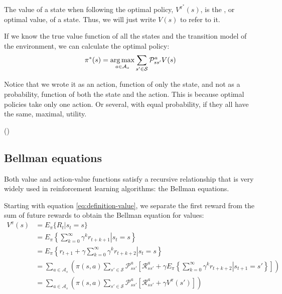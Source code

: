 The value of a state when following the optimal policy, $V^{\pi^*}(s)$, is the
, or optimal value, of a state. Thus, we will just write $V(s)$ to refer to it.

If we know the true value function of all the states and the transition model of
the environment, we can calculate the optimal policy:
\begin{equation}
  \pi^*(s) = \argmax_{a\in\mathcal{A}_s} \sum_{s'\in\mathcal{S}}\mathcal{P}^a_{ss'}V(s)
  \label{eq:optimal-policy-value}
\end{equation}

Notice that we wrote it as an action, function of only the state, and not as a
probability, function of both the state and the action. This is because optimal
policies take only one action. Or several, with equal probability, if they all
have the same, maximal, utility.

(\cite[Subsection~17.1.2]{russell2009aima})

\subsection{Bellman equations}
Both value and action-value functions satisfy a recursive relationship that is
very widely used in reinforcement learning algorithms: the Bellman equations.

Starting with equation \ref{eq:definition-value}, we separate the first reward
from the sum of future rewards to obtain the Bellman equation for values:
\begin{equation}
\begin{split}
  V^\pi(s) & = E_\pi \lbrace R_t | s_t = s \rbrace \\
  & = E_\pi \left\{ \left. \sum_{k=0}^\infty \gamma^kr_{t+k+1} \right| s_t = s \right\} \\
  & = E_\pi \left\{ \left. r_{t+1} + \gamma\sum_{k=0}^\infty \gamma^kr_{t+k+2} \right| s_t = s \right\} \\
  & = \sum_{a\in\mathcal{A}_s} \left( \pi(s, a) \sum_{s' \in \mathcal{S}}\mathcal{P}^a_{ss'}
\left[\mathcal{R}^a_{ss'} + \gamma E_\pi \left\{ \left. \sum_{k=0}^\infty
\gamma^kr_{t+k+2} \right| s_{t+1} = s' \right\} \right] \right) \\
  & = \sum_{a\in\mathcal{A}_s} \left( \pi(s, a) \sum_{s' \in \mathcal{S}}\mathcal{P}^a_{ss'}
\left[\mathcal{R}^a_{ss'} + \gamma V^\pi(s') \right] \right)
\end{split}
\label{eq:bellman-v}
\end{equation}

